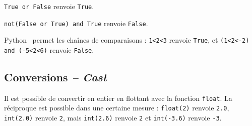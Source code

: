 \begin{exemple}
\lstinline{True or False} renvoie \lstinline{True}. 

\lstinline{not(False or True) and True} renvoie \lstinline{False}.
\end{exemple}

\begin{remarque}
Python \ permet les chaînes de comparaisons : \lstinline{1<2<3} renvoie
\lstinline{True}, et \lstinline{(1<2<-2) and (-5<2<6)} renvoie \lstinline{False}.
\end{remarque}

\subsection{Conversions \textit{-- Cast}}

Il est possible de convertir en entier en flottant avec la fonction \lstinline{float}. La réciproque est possible dans une certaine 
mesure : \lstinline{float(2)} renvoie \lstinline{2.0}, \lstinline{int(2.0)} renvoie \lstinline{2}, mais \lstinline{int(2.6)} renvoie \lstinline{2} et 
\lstinline{int(-3.6)} renvoie \lstinline{-3}.

